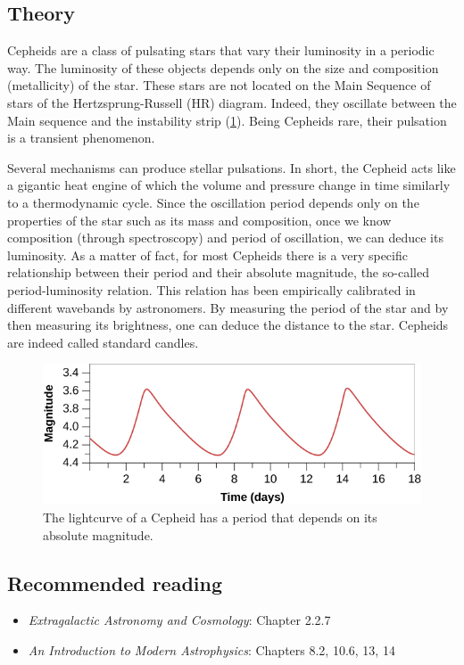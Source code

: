 \documentclass[a4paper, 11pt, fleqn]{memoir}
\begin{document}
\subsection{Theory}

Cepheids are a class of pulsating stars that vary their luminosity in a periodic way.
The luminosity of these objects depends only on the size and composition (metallicity) of the star.
These stars are not located on the Main Sequence of stars of the Hertzsprung-Russell (HR) diagram.
Indeed, they oscillate between the Main sequence and the instability strip (\cref{fig:cepheid-lightcurve}).
Being Cepheids rare, their pulsation is a transient phenomenon.

Several mechanisms can produce stellar pulsations.
In short, the Cepheid acts like a gigantic heat engine of which the volume and pressure change in time similarly to a thermodynamic cycle.
Since the oscillation period depends only on the properties of the star such as its mass and composition, once we know composition (through spectroscopy) and period of oscillation, we can deduce its luminosity.
As a matter of fact, for most Cepheids there is a very specific relationship between their period and their absolute magnitude, the so-called period-luminosity relation.
This relation has been empirically calibrated in different wavebands by astronomers.
By measuring the period of the star and by then measuring its brightness, one can deduce the distance to the star.
Cepheids are indeed called standard candles.

\begin{figure}
    \centering
    \includegraphics[width=0.7 \textwidth]{cepheid-light-curve}
    \caption{The lightcurve of a Cepheid has a period that depends on its absolute magnitude. %
    }
    \label{fig:cepheid-lightcurve}
\end{figure}

\subsection{Recommended reading}
\begin{itemize}
     \item \emph{Extragalactic Astronomy and Cosmology}\autocite{Schneider2006ExtragalacticAstronomy}: Chapter 2.2.7
     \item \emph{An Introduction to Modern Astrophysics}\autocite{carroll2017introduction}: Chapters 8.2, 10.6, 13, 14
 \end{itemize}
\end{document}
